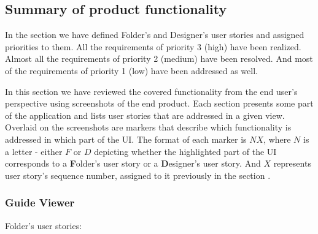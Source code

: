\subsection{Summary of product functionality}

In the  section we have defined Folder's and Designer's user stories and assigned priorities to them.
All the requirements of priority 3 (high) have been realized.
Almost all the requirements of priority 2 (medium) have been resolved.
And most of the requirements of priority 1 (low) have been addressed as well.
\smallskip

In this section we have reviewed the covered functionality from the end user's perspective using screenshots of the end product.
Each section presents some part of the application and lists user stories that are addressed in a given view.
Overlaid on the screenshots are markers that describe which functionality is addressed in which part of the UI.
The format of each marker is $NX$, where $N$ is a letter - either $F$ or $D$ depicting whether  
the highlighted part of the UI corresponds to a \textbf{F}older's user story or a \textbf{D}esigner's user story.
And $X$ represents user story's sequence number, assigned to it previously in the section .

\subsubsection{Guide Viewer}

Folder's user stories:
\begin{enumerate}
	\setcounter{enumi}{0}

	\setcounter{enumi}{13}

\end{enumerate}

